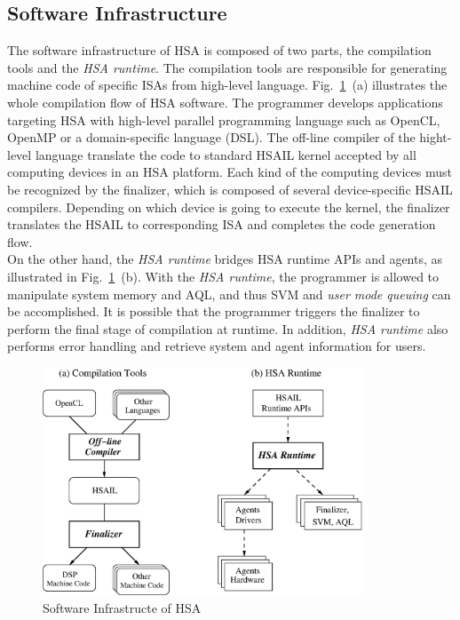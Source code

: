         \subsection{Software Infrastructure}
        The software infrastructure of HSA is composed of two parts, the compilation tools and the \textit{HSA runtime}.   
        The compilation tools are responsible for generating machine code of specific ISAs from high-level language.
        Fig.~\ref{fig:swinf}~(a) illustrates the whole compilation flow of HSA software.
        The programmer develops applications targeting HSA with high-level parallel programming language such as OpenCL, OpenMP or a domain-specific language (DSL).
        The off-line compiler of the hight-level language translate the code to standard HSAIL kernel accepted by all computing devices in an HSA platform.
        Each kind of the computing devices must be recognized by the finalizer, 
        which is composed of several device-specific HSAIL compilers.
        Depending on which device is going to execute the kernel, 
        the finalizer translates the HSAIL to corresponding ISA and completes the code generation flow.
        \\\indent
        On the other hand, the \textit{HSA runtime} bridges HSA runtime APIs and agents, as illustrated in Fig.~\ref{fig:swinf}~(b).
        With the \textit{HSA runtime}, the programmer is allowed to manipulate system memory and AQL, 
        and thus SVM and \textit{user mode queuing} can be accomplished.
        It is possible that the programmer triggers the finalizer to perform the final stage of compilation at runtime.
        In addition, \textit{HSA runtime} also performs error handling and retrieve system and agent information for users.
        \vspace{\textfig}
        \begin{figure}[!ht] 
            \centering
            \includegraphics[width=0.85\textwidth]{./figs/swinf.eps}
            \caption{Software Infrastructe of HSA}
            \label{fig:swinf}
        \end{figure}

